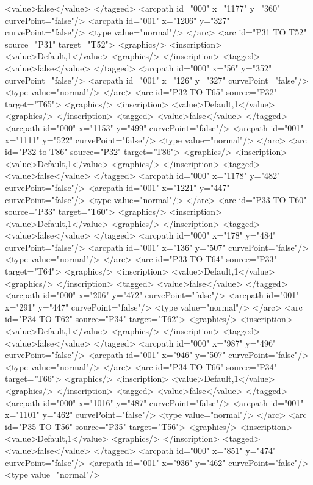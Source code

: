 <value>false</value>
</tagged>
<arcpath id="000" x="1177" y="360" curvePoint="false"/>
<arcpath id="001" x="1206" y="327" curvePoint="false"/>
<type value="normal"/>
</arc>
<arc id="P31 TO T52" source="P31" target="T52">
<graphics/>
<inscription>
<value>Default,1</value>
<graphics/>
</inscription>
<tagged>
<value>false</value>
</tagged>
<arcpath id="000" x="56" y="352" curvePoint="false"/>
<arcpath id="001" x="126" y="327" curvePoint="false"/>
<type value="normal"/>
</arc>
<arc id="P32 TO T65" source="P32" target="T65">
<graphics/>
<inscription>
<value>Default,1</value>
<graphics/>
</inscription>
<tagged>
<value>false</value>
</tagged>
<arcpath id="000" x="1153" y="499" curvePoint="false"/>
<arcpath id="001" x="1111" y="522" curvePoint="false"/>
<type value="normal"/>
</arc>
<arc id="P32 to T86" source="P32" target="T86">
<graphics/>
<inscription>
<value>Default,1</value>
<graphics/>
</inscription>
<tagged>
<value>false</value>
</tagged>
<arcpath id="000" x="1178" y="482" curvePoint="false"/>
<arcpath id="001" x="1221" y="447" curvePoint="false"/>
<type value="normal"/>
</arc>
<arc id="P33 TO T60" source="P33" target="T60">
<graphics/>
<inscription>
<value>Default,1</value>
<graphics/>
</inscription>
<tagged>
<value>false</value>
</tagged>
<arcpath id="000" x="178" y="484" curvePoint="false"/>
<arcpath id="001" x="136" y="507" curvePoint="false"/>
<type value="normal"/>
</arc>
<arc id="P33 TO T64" source="P33" target="T64">
<graphics/>
<inscription>
<value>Default,1</value>
<graphics/>
</inscription>
<tagged>
<value>false</value>
</tagged>
<arcpath id="000" x="206" y="472" curvePoint="false"/>
<arcpath id="001" x="291" y="447" curvePoint="false"/>
<type value="normal"/>
</arc>
<arc id="P34 TO T62" source="P34" target="T62">
<graphics/>
<inscription>
<value>Default,1</value>
<graphics/>
</inscription>
<tagged>
<value>false</value>
</tagged>
<arcpath id="000" x="987" y="496" curvePoint="false"/>
<arcpath id="001" x="946" y="507" curvePoint="false"/>
<type value="normal"/>
</arc>
<arc id="P34 TO T66" source="P34" target="T66">
<graphics/>
<inscription>
<value>Default,1</value>
<graphics/>
</inscription>
<tagged>
<value>false</value>
</tagged>
<arcpath id="000" x="1016" y="487" curvePoint="false"/>
<arcpath id="001" x="1101" y="462" curvePoint="false"/>
<type value="normal"/>
</arc>
<arc id="P35 TO T56" source="P35" target="T56">
<graphics/>
<inscription>
<value>Default,1</value>
<graphics/>
</inscription>
<tagged>
<value>false</value>
</tagged>
<arcpath id="000" x="851" y="474" curvePoint="false"/>
<arcpath id="001" x="936" y="462" curvePoint="false"/>
<type value="normal"/>
